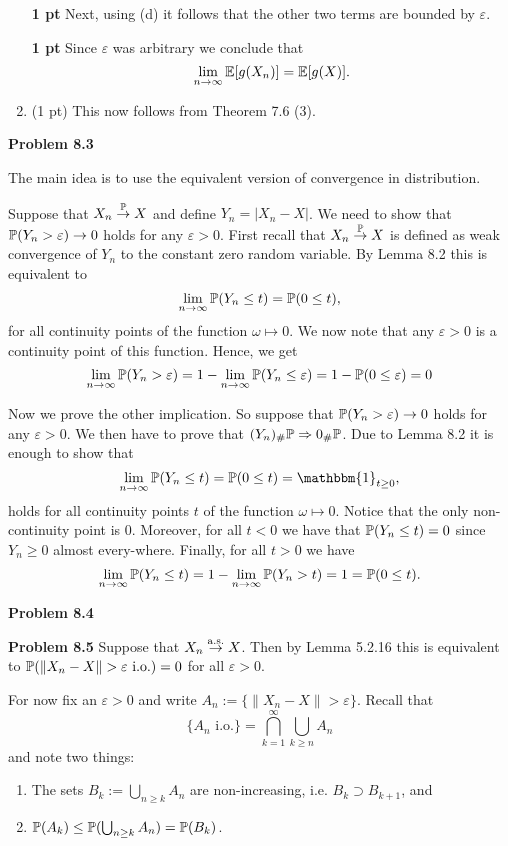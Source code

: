 \begin{enumerate}[label={(\alph*)}]
\textbf{1 pt} Next, using (d) it follows that the other two terms are bounded by $\varepsilon$.

\textbf{1 pt} Since $\varepsilon$ was arbitrary we conclude that
\[
	\lim_{n \to \infty} \mathbb E[g(X_n)] = \mathbb E[g(X)].
\]
\item (1 pt) This now follows from Theorem 7.6 (3).
\end{enumerate}

\bigskip

\textbf{Problem 8.3}

The main idea is to use the equivalent version of convergence in distribution.

Suppose that $X_n \stackrel{\mathbb P}{\rightarrow} X$ and define $Y_n = |X_n - X|$. We need to show that $\mathbb P(Y_n > \varepsilon) \to 0$ holds for any $\varepsilon > 0$. First recall that $X_n \stackrel{\mathbb P}{\rightarrow} X$ is defined as weak convergence of $Y_n$ to the constant zero random variable. By Lemma 8.2 this is equivalent to 
\[
	\lim_{n \to \infty} \mathbb P(Y_n \le t) = \mathbb P(0 \le t),
\]
for all continuity points of the function $\omega \mapsto 0$. We now note that any $\varepsilon > 0$ is a continuity point of this function. Hence, we get
\[
	\lim_{n \to \infty} \mathbb P(Y_n > \varepsilon) = 1 - \lim_{n \to \infty} \mathbb P(Y_n \le \varepsilon) = 1 - \mathbb P(0 \le \varepsilon) = 0
\]

Now we prove the other implication. So suppose that $\mathbb P(Y_n > \varepsilon) \to 0$ holds for any $\varepsilon > 0$. We then have to prove that $(Y_n)_\# \mathbb P \Rightarrow 0_\# \mathbb P$. Due to Lemma 8.2 it is enough to show that
\[
	\lim_{n \to \infty} \bbP(Y_n \le t) = \bbP(0 \le t) = \mathbbm{1}_{t \ge 0},
\]
holds for all continuity points $t$ of the function $\omega \mapsto 0$. Notice that the only non-continuity point is $0$. Moreover, for all $t < 0$ we have that $\mathbb P(Y_n \le t) = 0$ since $Y_n \ge 0$ almost every-where. Finally, for all $t > 0$ we have
\[
	\lim_{n \to \infty} \mathbb P(Y_n \le t) = 1 - \lim_{n \to \infty} \mathbb P(Y_n > t) = 1 = \mathbb P(0 \le t). 
\]

\bigskip

\textbf{Problem 8.4}



\bigskip

\textbf{Problem 8.5}
Suppose that $X_n \stackrel{\mathrm{a.s.}}{\rightarrow} X$. Then by Lemma 5.2.16 this is equivalent to $\mathbb P(\|X_n - X\| > \varepsilon \text{ i.o.}) = 0$ for all $\varepsilon > 0$. 

For now fix an $\varepsilon > 0$ and write $A_n := \{\|X_n - X\| > \varepsilon\}$. Recall that
\[
	\{A_n \text{ i.o.}\} = \bigcap_{k = 1}^\infty \bigcup_{k \ge n} A_n
\]
and note two things:
\begin{enumerate}[label={(\alph*)}]
\item The sets $B_k := \bigcup_{n \ge k} A_n$ are non-increasing, i.e. $B_k \supset B_{k+1}$, and
\item $\mathbb P(A_k) \le \mathbb P(\bigcup_{n \ge k} A_n) = \mathbb P(B_k)$.
\end{enumerate}
 
